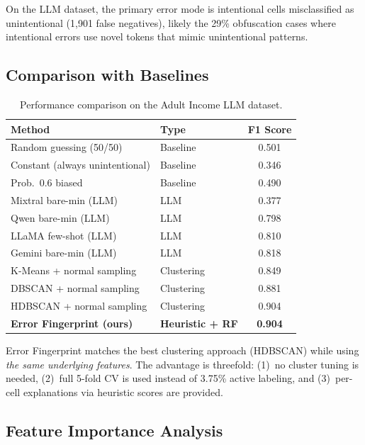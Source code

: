 \documentclass[11pt,a4paper]{article}
\begin{document}
On the LLM dataset, the primary error mode is intentional cells misclassified
as unintentional (1{,}901 false negatives), likely the 29\% obfuscation cases
where intentional errors use novel tokens that mimic unintentional patterns.

\subsection{Comparison with Baselines}

\begin{table}[h]
\centering
\caption{Performance comparison on the Adult Income LLM dataset.}
\label{tab:comparison}
\begin{tabular}{@{}llc@{}}
\toprule
\textbf{Method} & \textbf{Type} & \textbf{F1 Score} \\
\midrule
Random guessing (50/50) & Baseline & 0.501 \\
Constant (always unintentional) & Baseline & 0.346 \\
Prob.\ 0.6 biased & Baseline & 0.490 \\
\addlinespace
Mixtral bare-min (LLM) & LLM & 0.377 \\
Qwen bare-min (LLM) & LLM & 0.798 \\
LLaMA few-shot (LLM) & LLM & 0.810 \\
Gemini bare-min (LLM) & LLM & 0.818 \\
\addlinespace
K-Means + normal sampling & Clustering & 0.849 \\
DBSCAN + normal sampling & Clustering & 0.881 \\
HDBSCAN + normal sampling & Clustering & 0.904 \\
\addlinespace
\textbf{Error Fingerprint (ours)} & \textbf{Heuristic + RF} & \textbf{0.904} \\
\bottomrule
\end{tabular}
\end{table}

Error Fingerprint matches the best clustering approach (HDBSCAN) while using
\emph{the same underlying features}.  The advantage is threefold:
(1)~no cluster tuning is needed,
(2)~full 5-fold CV is used instead of 3.75\% active labeling, and
(3)~per-cell explanations via heuristic scores are provided.

\subsection{Feature Importance Analysis}
\end{document}

